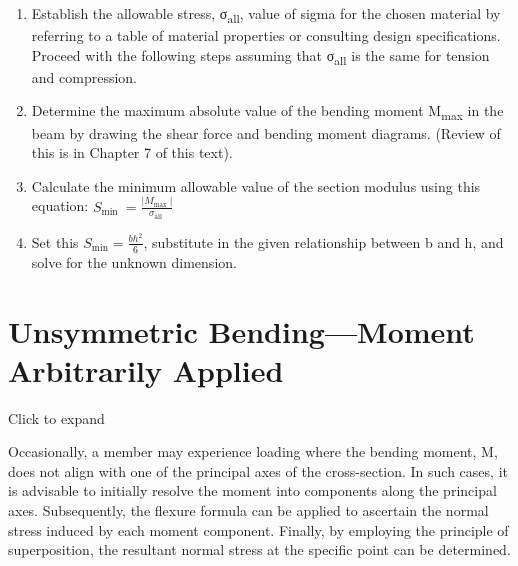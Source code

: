 \documentclass[
  letterpaper,
  DIV=11,
  numbers=noendperiod]{scrreprt}
\providecommand{\tightlist}{%
  \setlength{\itemsep}{0pt}\setlength{\parskip}{0pt}}\usepackage{longtable,booktabs,array}
\begin{document}
\begin{tcolorbox}[enhanced jigsaw, colbacktitle=quarto-callout-note-color!10!white, title={Step-by-step: Title?}, coltitle=black, leftrule=.75mm, rightrule=.15mm, opacityback=0, breakable, colframe=quarto-callout-note-color-frame, left=2mm, arc=.35mm, colback=white, bottomrule=.15mm, bottomtitle=1mm, toptitle=1mm, titlerule=0mm, opacitybacktitle=0.6, toprule=.15mm]

\begin{enumerate}
\def\labelenumi{\arabic{enumi}.}
\tightlist
\item
  Establish the allowable stress, σ\textsubscript{all}, value of sigma
  for the chosen material by referring to a table of material properties
  or consulting design specifications. Proceed with the following steps
  assuming that σ\textsubscript{all} is the same for tension and
  compression.
\item
  Determine the maximum absolute value of the bending moment
  \textbar M\textsubscript{max}\textbar{} in the beam by drawing the
  shear force and bending moment diagrams. (Review of this is in Chapter
  7 of this text).
\item
  Calculate the minimum allowable value of the section modulus using
  this equation:
  \(S_{\text {min }}=\frac{\left|M_{\text {max }}\right|}{\sigma_{\text {all }}}\)
\item
  Set this \(S_{\min }=\frac{b h^2}{6}\), substitute in the given
  relationship between b and h, and solve for the unknown dimension.
\end{enumerate}

\end{tcolorbox}

\section{Unsymmetric Bending---Moment Arbitrarily
Applied}\label{unsymmetric-bendingmoment-arbitrarily-applied}

Click to expand

Occasionally, a member may experience loading where the bending moment,
M, does not align with one of the principal axes of the cross-section.
In such cases, it is advisable to initially resolve the moment into
components along the principal axes. Subsequently, the flexure formula
can be applied to ascertain the normal stress induced by each moment
component. Finally, by employing the principle of superposition, the
resultant normal stress at the specific point can be determined.
\end{document}
